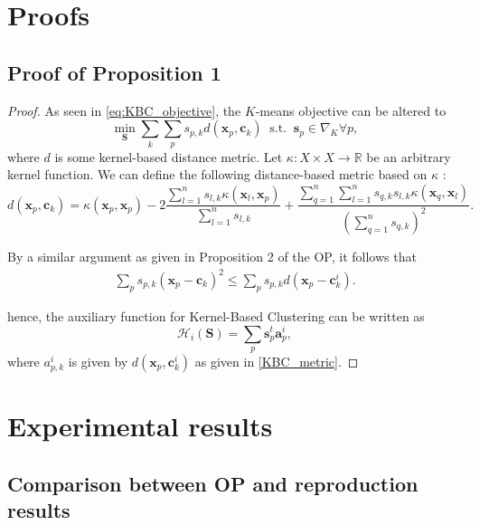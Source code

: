 \newpage

\section{Proofs}
\label{appendix:proof_prop_1}

\subsection*{Proof of Proposition 1}

\begin{proof}
As seen in \autoref{eq:KBC_objective}, the $K$-means objective can be altered to
$$\min_{\mathbf{S}} \sum_k \sum_p s_{p, k} d(\textbf{x}_p, \textbf{c}_k) ~\text{ s.t. }~ \textbf{s}_p \in \nabla_K \forall p,$$
where $d$ is some kernel-based distance metric. Let $\kappa: X \times X \to \mathbb{R}$ be an arbitrary kernel function. We can define the following distance-based metric based on $\kappa$ \citep{hall2012objective}:
\begin{equation}
\label{KBC_metric}
  d(\textbf{x}_p, \textbf{c}_k) = \kappa(\textbf{x}_p, \textbf{x}_p) - 2 \frac{\sum_{l=1}^n s_{l, k} \kappa(\textbf{x}_l, \textbf{x}_p)}{\sum_{l=1}^n s_{l, k}} + \frac{\sum_{q=1}^n \sum_{l=1}^n s_{q, k} s_{l, k} \kappa(\textbf{x}_q, \textbf{x}_l)}{(\sum_{q=1}^n s_{q, k})^2}.
\end{equation}

By a similar argument as given in Proposition 2 of the OP, it follows that
\begin{align*}
    \sum_p s_{p, k}(\textbf{x}_p - \textbf{c}_k)^2 \leq \sum_p s_{p, k}d(\textbf{x}_p - \textbf{c}^i_k).
\end{align*}

hence, the auxiliary function for Kernel-Based Clustering can be written as
\begin{equation*}
    \mathcal{H}_i(\mathbf{S}) = \sum_p \textbf{s}_p^t  \textbf{a}_p^i,
\end{equation*}
where $a_{p, k}^i$ is given by $d(\textbf{x}_p, \textbf{c}_k^i)$ as given in \autoref{KBC_metric}.\end{proof}


\newpage
\section{Experimental results}\label{appendix:figsandtabs}
\label{figures}

\subsection*{Comparison between OP and reproduction results}

